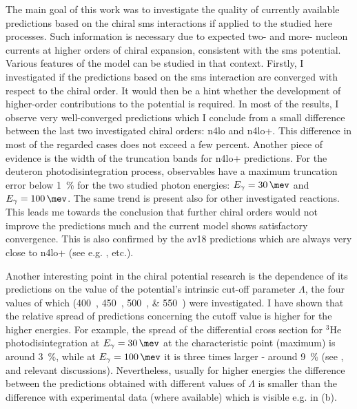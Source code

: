 The main goal of this work was to investigate the quality of currently available
predictions based on the chiral \gls{sms}
interactions if applied to the studied here processes.
Such information is necessary due to expected two- and more- nucleon currents
at higher orders of chiral expansion, consistent with the \gls{sms} potential.
Various features of the model can be studied in that context.
Firstly, I investigated if the predictions based on the \gls{sms} interaction
are converged with respect to the chiral order.
It would then be a hint whether the development of higher-order contributions to the potential is required.
In most of the results, I observe very well-converged predictions which I conclude from a small difference
between the last two investigated chiral orders: \gls{n4lo} and \gls{n4lo+}. This
difference in most of the regarded cases does not exceed a few percent.
Another piece of evidence is the width of the truncation bands for \gls{n4lo+} predictions.
For the deuteron photodisintegration process, observables have a maximum
truncation error below \SI{1}{\percent} for the two studied photon energies:
$E_\gamma=\SI{30}{\mev}$ and $E_\gamma=\SI{100}{\mev}$.
The same trend is present also for other investigated reactions.
This leads me towards the conclusion that further chiral orders would not
improve the predictions much and the current model shows satisfactory convergence.
This is also confirmed by the \gls{av18} predictions which are
always very close to \gls{n4lo+} (see e.g. ,  etc.).

Another interesting point in the chiral potential research is the dependence of its predictions
on the value of the potential's intrinsic cut-off parameter $\Lambda$, the four values of which (\SIlist[list-units = single]{400;450;500;550}{\mev}) 
were investigated. I have shown that the relative spread of predictions 
concerning the cutoff value is higher for the higher energies.
For example, the spread of the differential cross section for $^3$He photodisintegration
at $E_\gamma=\SI{30}{\mev}$ at the characteristic point (maximum) is around \SI{3}{\percent},
while at $E_\gamma=\SI{100}{\mev}$ it is three times larger - around \SI{9}{\percent}
(see ,  and relevant discussions).
Nevertheless, usually for higher energies the difference between the predictions
obtained with different values of $\Lambda$ is smaller than the difference with experimental
data (where available) which is visible e.g. in (b).

